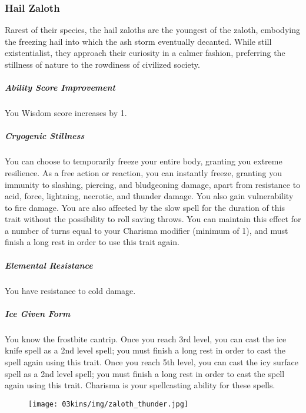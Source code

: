 \begin{linenumbers}
\subsubsection{Hail Zaloth}
Rarest of their species, the hail zaloths are the youngest of the zaloth, embodying the freezing hail into which the ash storm eventually decanted.
While still existentialist, they approach their curiosity in a calmer fashion, preferring the stillness of nature to the rowdiness of civilized society.
\subparagraph{Ability Score Improvement} You Wisdom score increases by 1.
\subparagraph{Cryogenic Stillness} You can choose to temporarily freeze your entire body, granting you extreme resilience.
As a free action or reaction, you can instantly freeze, granting you immunity to slashing, piercing, and bludgeoning damage, apart from resistance to acid, force, lightning, necrotic, and thunder damage.
You also gain vulnerability to fire damage.
You are also affected by the slow spell for the duration of this trait without the possibility to roll saving throws.
You can maintain this effect for a number of turns equal to your Charisma modifier (minimum of 1), and must finish a long rest in order to use this trait again.
\subparagraph{Elemental Resistance} You have resistance to cold damage.
\subparagraph{Ice Given Form} You know the frostbite cantrip.
Once you reach 3rd level, you can cast the ice knife spell as a 2nd level spell; you must finish a long rest in order to cast the spell again using this trait.
Once you reach 5th level, you can cast the icy surface spell as a 2nd level spell; you must finish a long rest in order to cast the spell again using this trait.
Charisma is your spellcasting ability for these spells.

\begin{figure}[!b]
    \centering
    \texttt{[image: 03kins/img/zaloth\_thunder.jpg]}
\end{figure}

\end{linenumbers}

